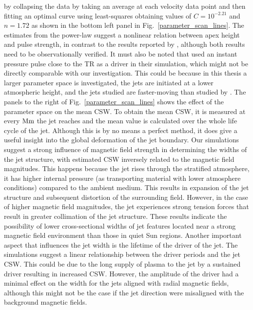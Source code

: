by collapsing the data by taking an average at each velocity data point and then fitting an optimal curve using least-squares obtaining values of $C= 10^{-2.21}$ and $n= 1.72$ as shown in the bottom left panel in Fig.~\ref{parameter_scan_lines}. The estimates from the power-law suggest a nonlinear relation between apex height and pulse strength, in contrast to the results reported by \citet{Singh2019}, although both results need to be observationally verified. It must also be noted that \citet{Singh2019} used an instant pressure pulse close to the TR as a driver in their simulation, which might not be directly comparable with our investigation. This could be because in this thesis a larger parameter space is investigated, the jets are initiated at a lower atmospheric height, and the jets studied are faster-moving than studied by \citet{Singh2019}.  \np
%
The panels to the right of Fig.~\ref{parameter_scan_lines} shows the effect of the parameter space on the mean CSW. To obtain the mean CSW, it is measured at every $\rm{Mm}$ the jet reaches and the mean value is calculated over the whole life cycle of the jet. Although this is by no means a perfect method, it does give a useful insight into the global deformation of the jet boundary. Our simulations suggest a strong influence of magnetic field strength in determining the widths of the jet structure, with estimated CSW inversely related to the magnetic field magnitudes. This happens because the jet rises through the stratified atmosphere, it has higher internal pressure (as transporting material with lower atmosphere conditions) compared to the ambient medium. This results in expansion of the jet structure and subsequent distortion of the surrounding field. However, in the case of higher magnetic field magnitudes, the jet experiences strong tension forces that result in greater collimation of the jet structure. These results indicate the possibility of lower cross-sectional widths of jet features located near a strong magnetic field environment than those in quiet Sun regions. Another important aspect that influences the jet width is the lifetime of the driver of the jet. The simulations suggest a linear relationship between the driver periods and the jet CSW. This could be due to the long supply of plasma to the jet by a sustained driver resulting in increased CSW. However, the amplitude of the driver had a minimal effect on the width for the jets aligned with radial magnetic fields, although this might not be the case if the jet direction were misaligned with the background magnetic fields.
